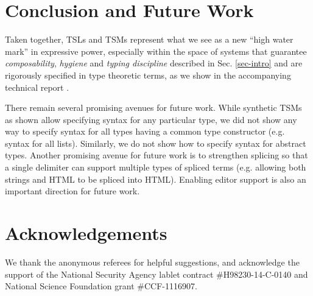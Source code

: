 \documentclass{sig-alternate}[10pt]
\begin{document}
\section{Conclusion and Future Work}\label{conclusion}
Taken together, TSLs and TSMs represent what we see as a new ``high water mark'' in expressive power, especially within the space of systems that guarantee \emph{composability}, \emph{hygiene} and \emph{typing discipline} described in Sec. \ref{sec-intro} and are rigorously specified in type theoretic terms, as we show in the accompanying technical report \cite{sac15tr}.

There remain several promising avenues for future work. While synthetic TSMs as shown allow specifying syntax for any particular type, we did not show any way to specify syntax for all types having a common type constructor (e.g. syntax for all lists). Similarly, we do not show how to specify syntax for abstract types. Another promising avenue for future work is to strengthen splicing so that a single delimiter can support multiple types of spliced terms (e.g. allowing both strings and HTML to be spliced into HTML). Enabling editor support is also an important direction for future work.

\section*{Acknowledgements}
We thank the anonymous referees for helpful suggestions, and acknowledge the support of the National Security Agency lablet contract \#H98230-14-C-0140 and National Science Foundation grant \#CCF-1116907.


\end{document}
